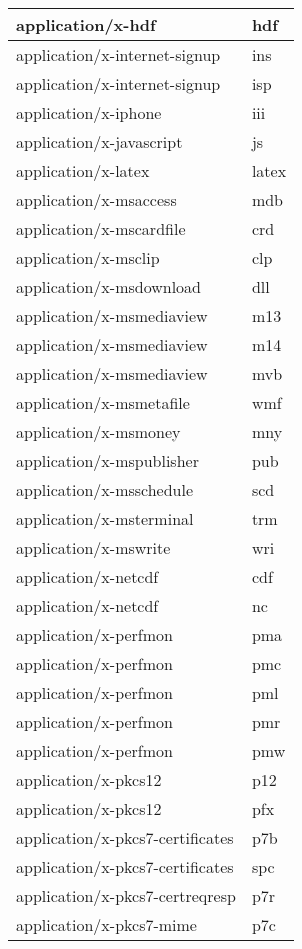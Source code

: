 \begin{longtable}{|p{200pt}|p{40pt}|}
\hline
application/x-hdf						&hdf\\
\hline
application/x-internet-signup			&ins\\
\hline
application/x-internet-signup			&isp\\
\hline
application/x-iphone						&iii\\
\hline
application/x-javascript					&js\\
\hline
application/x-latex	 					& latex\\
\hline
application/x-msaccess					&mdb\\
\hline
application/x-mscardfile					&crd\\
\hline
application/x-msclip						&clp\\
\hline
application/x-msdownload				&dll\\
\hline
application/x-msmediaview				& m13\\
\hline
application/x-msmediaview				& m14\\
\hline
application/x-msmediaview				& mvb\\
\hline
application/x-msmetafile	 				&wmf\\
\hline
application/x-msmoney					&mny\\
\hline
application/x-mspublisher				&pub\\
\hline
application/x-msschedule				& scd\\
\hline
application/x-msterminal				&trm\\
\hline
application/x-mswrite					&wri\\
\hline
application/x-netcdf						&cdf\\
\hline
application/x-netcdf						& nc\\
\hline
application/x-perfmon					&pma\\
\hline
application/x-perfmon					&pmc\\
\hline
application/x-perfmon	&pml\\
\hline
application/x-perfmon	&pmr\\
\hline
application/x-perfmon	&pmw\\
\hline
application/x-pkcs12	&p12\\
\hline
application/x-pkcs12	&pfx\\
\hline
application/x-pkcs7-certificates	&p7b\\
\hline
application/x-pkcs7-certificates	&spc\\
\hline
application/x-pkcs7-certreqresp	&p7r\\
\hline
application/x-pkcs7-mime	&p7c\\

\end{longtable}
